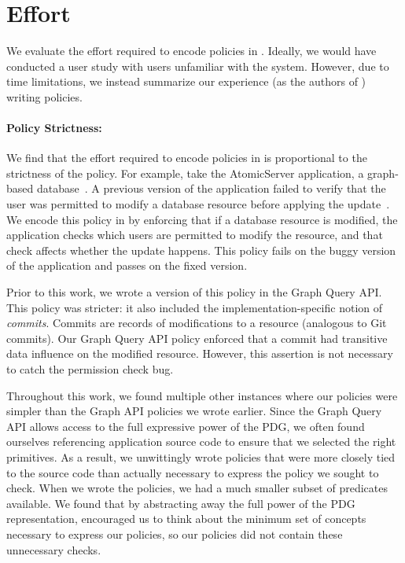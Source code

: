 \section{Effort}
\label{sec:accessibility}

We evaluate the effort required to encode policies in \syslang{}.
%
Ideally, we would have conducted a user study with users unfamiliar with the system.
%
However, due to time limitations, we instead summarize our experience (as the authors of \sys{}) writing policies.
%

\paragraph{Policy Strictness:} We find that the effort required to encode policies in \syslang{} is proportional to the strictness of the policy.
%
For example, take the AtomicServer application, a graph-based database~\cite{atomic}.
%
A previous version of the application failed to verify that the 
user was permitted to modify a database resource before applying the update~\cite{atomic-fix}.
%
We encode this policy in \syslang{} by enforcing that if a database resource is modified,
the application checks which users are permitted to modify the resource,
and that check affects whether the update happens.
%
This policy fails on the buggy version of the application and passes on the fixed version.

Prior to this work, we wrote a version of this policy in the Graph Query API.
%
This policy was stricter: it also included the implementation-specific notion of \emph{commits}.
%
Commits are records of modifications to a resource (analogous to Git commits).
%
Our Graph Query API policy enforced that a commit had transitive data influence on the modified resource.
%
However, this assertion is not necessary to catch the permission check bug.
%

Throughout this work, we found multiple other instances where our \syslang{}
policies were simpler than the Graph API policies we wrote earlier.
%
Since the Graph Query API allows \devs{} access to the full expressive power of the PDG,
we often found ourselves referencing application source code to ensure that we selected the right primitives.
%
As a result, we unwittingly wrote policies that were more closely tied to the 
source code than actually necessary to express the policy we sought to check.
%
When we wrote the \syslang{} policies, 
we had a much smaller subset of predicates available.
%
We found that by abstracting away the full power of the PDG representation,
\syslang{} encouraged us to think about the minimum set of concepts
necessary to express our policies,
so our policies did not contain these unnecessary checks.

